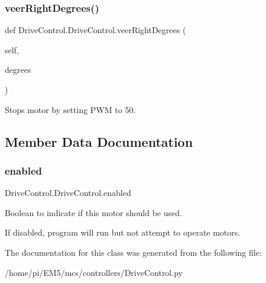 \subsubsection{\texorpdfstring{veer\+Right\+Degrees()}{veerRightDegrees()}}
{\footnotesize\ttfamily def Drive\+Control.\+Drive\+Control.\+veer\+Right\+Degrees (\begin{DoxyParamCaption}\item[{}]{self,  }\item[{}]{degrees }\end{DoxyParamCaption})}



Stops motor by setting P\+WM to 50. 



\subsection{Member Data Documentation}
\mbox{\label{classDriveControl_1_1DriveControl_a956999a0f333b37334795c1582497eb2}} 
\subsubsection{\texorpdfstring{enabled}{enabled}}
{\footnotesize\ttfamily Drive\+Control.\+Drive\+Control.\+enabled}



Boolean to indicate if this motor should be used. 

If disabled, program will run but not attempt to operate motors. 

The documentation for this class was generated from the following file\+:\begin{DoxyCompactItemize}
\item 
/home/pi/\+E\+M5/mcs/controllers/Drive\+Control.\+py\end{DoxyCompactItemize}

